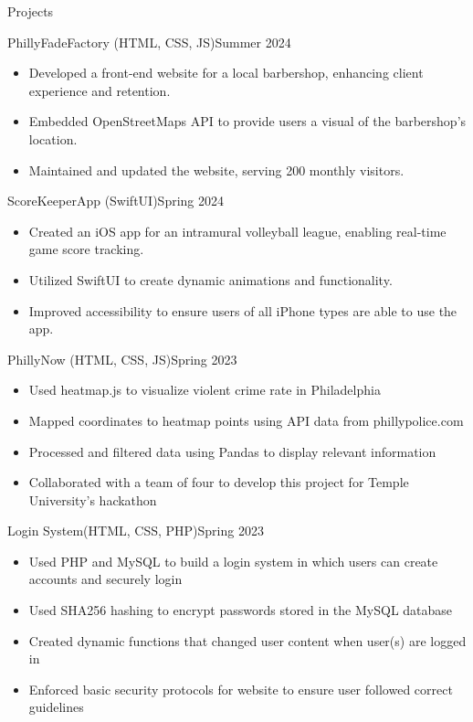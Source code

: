 \documentclass[]{mcdowellcv}
\begin{document}
	\begin{cvsection}{Projects}
		\begin{cvsubsection}{PhillyFadeFactory (HTML, CSS, JS)}{}{Summer 2024}
			\begin{itemize}
				\item Developed a front-end website for a local barbershop, enhancing client experience and retention.
				\item Embedded OpenStreetMaps API to provide users a visual of the barbershop's location.
				\item Maintained and updated the website, serving 200 monthly visitors.
			\end{itemize}
		\end{cvsubsection}

		\begin{cvsubsection}{ScoreKeeperApp (SwiftUI)}{}{Spring 2024}
			\begin{itemize}
				\item Created an iOS app for an intramural volleyball league, enabling real-time game score tracking.
				\item Utilized SwiftUI to create dynamic animations and functionality.
				\item Improved accessibility to ensure users of all iPhone types are able to use the app.
			\end{itemize}
		\end{cvsubsection}

		\begin{cvsubsection}{PhillyNow (HTML, CSS, JS)}{}{Spring 2023}
			\begin{itemize}
				\item Used heatmap.js to visualize violent crime rate in Philadelphia
				\item Mapped coordinates to heatmap points using API data from phillypolice.com
				\item Processed and filtered data using Pandas to display relevant information
				\item Collaborated with a team of four to develop this project for Temple University's hackathon
			\end{itemize}
		\end{cvsubsection}

		\begin{cvsubsection}{Login System(HTML, CSS, PHP)}{}{Spring 2023}
			\begin{itemize}
				\item Used PHP and MySQL to build a login system in which users can create accounts and securely login
				\item Used SHA256 hashing to encrypt passwords stored in the MySQL database
				\item Created dynamic functions that changed user content when user(s) are logged in
				\item Enforced basic security protocols for website to ensure user followed correct guidelines
			\end{itemize}
		\end{cvsubsection}
	\end{cvsection}
\end{document}
